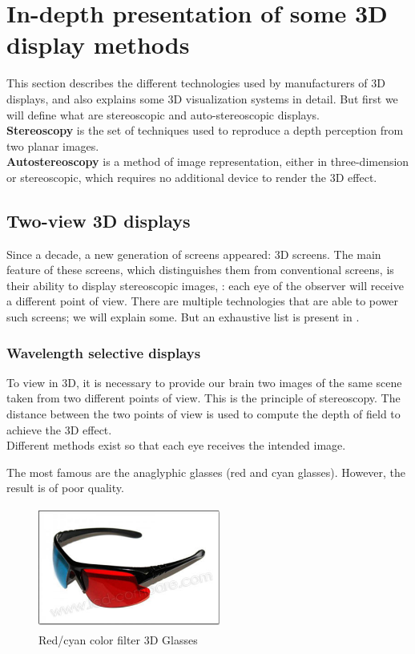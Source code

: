 \section{In-depth presentation of some 3D display methods}
This section describes the different technologies used by manufacturers of 3D displays, and also explains some 3D visualization systems in detail. But first we will define what are stereoscopic and auto-stereoscopic displays. \\
\textbf{Stereoscopy} is the set of techniques used to reproduce a depth perception from two planar images.\\
\textbf{Autostereoscopy} is a method of image representation, either in three-dimension or stereoscopic, which requires no additional device to render the 3D effect. 

\subsection{Two-view 3D displays}
Since a decade, a new generation of screens appeared: 3D screens. The main feature of these screens, which distinguishes them from conventional screens, is their ability to display stereoscopic images, : each eye of the observer will receive a different point of view.
There are multiple technologies that are able to power such screens; we will explain some. But an exhaustive list is present in \cite{mehrabi2013making}.

\subsubsection{Wavelength selective displays}
To view in 3D, it is necessary to provide our brain two images of the same scene taken from two different points of view. This is the principle of stereoscopy. The distance between the two points of view is used to compute the depth of field to achieve the 3D effect.\\
Different methods exist so that each eye receives the intended image. 

The most famous are the anaglyphic glasses (red and cyan glasses). However, the result is of poor quality.

\begin{figure}[h!]
\begin{center}
\begin{minipage}{1\linewidth}
\centering\includegraphics[width=6cm,height=40mm]{image/1.jpg}
\caption{Red/cyan color filter 3D Glasses\cite{ViewingOn3D}}
\end{minipage}
\end{center}
\end{figure}

